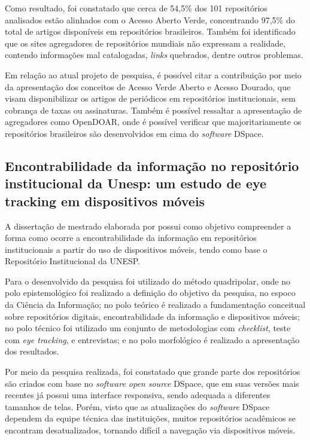 Como resultado, foi constatado que cerca de 54,5\% dos 101 repositórios
analisados estão alinhados com o Acesso Aberto Verde, concentrando 97,5\%
do total de artigos disponíveis em repositórios brasileiros. Também foi
identificado que os sites agregadores de repositórios mundiais não
expressam a realidade, contendo informações mal catalogadas,
\emph{links} quebrados, dentre outros problemas.

Em relação ao atual projeto de pesquisa, é possível citar a contribuição
por meio da apresentação dos conceitos de Acesso Verde Aberto e Acesso
Dourado, que visam disponibilizar os artigos de periódicos em repositórios
institucionais, sem cobrança de taxas ou assinaturas. Também é possível
ressaltar a apresentação de agregadores como OpenDOAR, onde é possível
verificar que majoritariamente os repositórios brasileiros são
desenvolvidos em cima do \emph{software} DSpace.

\subsection{Encontrabilidade da informação no repositório institucional da Unesp: um estudo de eye tracking em dispositivos móveis}

A dissertação de mestrado elaborada por \cite{2019:FernandesMacedes}
possui como objetivo compreender a forma como ocorre a encontrabilidade
da informação em repositórios institucionais a partir do uso de dispositivos
móveis, tendo como base o Repositório Institucional da UNESP.

Para o desenvolvido da pesquisa foi utilizado do método quadripolar, onde
no polo epistemológico foi realizado a definição do objetivo da pesquisa,
no espoco da Ciência da Informação; no polo teórico é realizado a
fundamentação conceitual sobre repositórios digitais, encontrabilidade
da informação e dispositivos móveis; no polo técnico foi utilizado um
conjunto de metodologias com \emph{checklist}, teste com \emph{eye tracking},
e entrevistas; e no polo morfológico é realizado a apresentação dos resultados.

Por meio da pesquisa realizada, foi constatado que grande parte dos
repositórios são criados com base no \emph{software open source} DSpace,
que em suas versões mais recentes já possui uma interface responsiva,
sendo adequada a diferentes tamanhos de telas. Porém, visto que as
atualizações do \emph{software} DSpace dependem da equipe técnica das instituições,
muitos repositórios acadêmicos se encontram desatualizados, tornando
difícil a navegação via dispositivos móveis.

